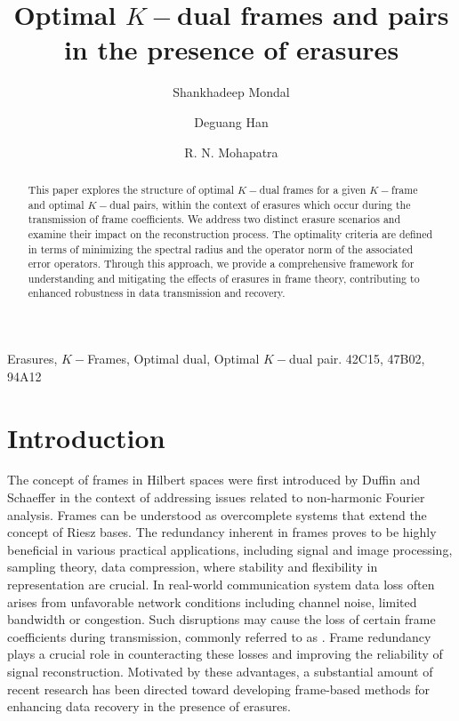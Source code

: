 \documentclass[final,1p,times]{elsarticle}
\begin{document}
	\begin{frontmatter}
		
		\title{Optimal $K-$dual frames and pairs in the presence of erasures}
		\author{Shankhadeep Mondal}
		\author{Deguang Han}
		\author{R. N. Mohapatra}
		
		\address{Department of Mathematics, University of Central Florida}
		
		\begin{abstract}
		This paper explores the structure of optimal $K-$dual frames for a given $K-$frame and optimal $K-$dual pairs, within the context of erasures which occur during the transmission of frame coefficients. We address two distinct erasure scenarios and examine their impact on the reconstruction process. The optimality criteria are defined in terms of minimizing the spectral radius and the operator norm of the associated error operators. Through this approach, we provide a comprehensive framework for understanding and mitigating the effects of erasures in frame theory, contributing to enhanced robustness in data transmission and recovery.
		\end{abstract}
		
		
		
		
		
		\begin{keyword}
			Erasures, $K-$Frames, Optimal dual, Optimal $K-$dual pair.
			\MSC[2010] 42C15, 47B02, 94A12
		\end{keyword}
		
	\end{frontmatter}
	
	
	
\section{Introduction}
The concept of frames in Hilbert spaces were first introduced by Duffin and Schaeffer \cite{duff} in the context of addressing issues related to non-harmonic Fourier analysis. Frames can be understood as overcomplete systems that extend the concept of Riesz bases. The redundancy inherent in frames proves to be highly beneficial in various practical applications, including signal and image processing, sampling theory, data compression, where stability and flexibility in representation are crucial. In real-world communication system data loss often arises from unfavorable network conditions including channel noise, limited bandwidth or congestion. Such disruptions may cause the loss of certain frame coefficients during transmission, commonly referred to as . Frame redundancy plays a crucial role in counteracting these losses and improving the reliability of signal reconstruction. Motivated by these advantages, a substantial amount of recent research has been directed toward developing frame-based methods for enhancing data recovery in the presence of erasures.
\end{document}
